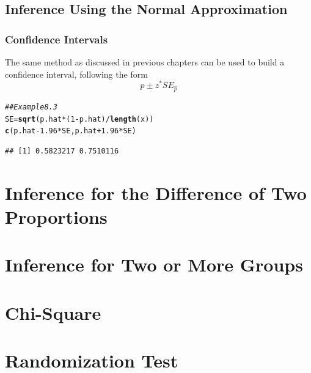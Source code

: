 \documentclass{report}\usepackage[]{graphicx}\usepackage[]{color}
\makeatletter
\newcommand{\hlnum}[1]{\textcolor[rgb]{0.686,0.059,0.569}{#1}}%
\newcommand{\hlcom}[1]{\textcolor[rgb]{0.678,0.584,0.686}{\textit{#1}}}%
\newcommand{\hlopt}[1]{\textcolor[rgb]{0,0,0}{#1}}%
\newcommand{\hlstd}[1]{\textcolor[rgb]{0.345,0.345,0.345}{#1}}%
\newcommand{\hlkwb}[1]{\textcolor[rgb]{0.69,0.353,0.396}{#1}}%
\newcommand{\hlkwd}[1]{\textcolor[rgb]{0.737,0.353,0.396}{\textbf{#1}}}%
\newenvironment{kframe}{%
 \def\at@end@of@kframe{}%
 \ifinner\ifhmode%
  \def\at@end@of@kframe{\end{minipage}}%
  \begin{minipage}{\columnwidth}%
 \fi\fi%
 \def\FrameCommand##1{\hskip\@totalleftmargin \hskip-\fboxsep
 \colorbox{shadecolor}{##1}\hskip-\fboxsep
     \hskip-\linewidth \hskip-\@totalleftmargin \hskip\columnwidth}%
 \MakeFramed {\advance\hsize-\width
   \@totalleftmargin\z@ \linewidth\hsize
   \@setminipage}}%
 {\par\unskip\endMakeFramed%
 \at@end@of@kframe}
\newenvironment{knitrout}{}{} %
\makeatother
\begin{document}
\subsection{Inference Using the Normal Approximation}
\subsubsection{Confidence Intervals}
The same method as discussed in previous chapters can be used to build a confidence interval, following the form 
\[ \hat{p} \pm z^* SE_{\hat{p}}\]

\begin{knitrout}
\color{fgcolor}\begin{kframe}
\begin{alltt}
\hlcom{## Example 8.3}
\hlstd{SE} \hlkwb{=} \hlkwd{sqrt}\hlstd{(p.hat}\hlopt{*}\hlstd{(}\hlnum{1}\hlopt{-}\hlstd{p.hat)}\hlopt{/}\hlkwd{length}\hlstd{(x))}
\hlkwd{c}\hlstd{(p.hat} \hlopt{-} \hlnum{1.96}\hlopt{*}\hlstd{SE, p.hat} \hlopt{+}  \hlnum{1.96}\hlopt{*}\hlstd{SE)}
\end{alltt}
\begin{verbatim}
## [1] 0.5823217 0.7510116
\end{verbatim}
\end{kframe}
\end{knitrout}





\section{Inference for the Difference of Two Proportions}


\section{Inference for Two or More Groups}


\section{Chi-Square} 


\section{Randomization Test}
\end{document}
